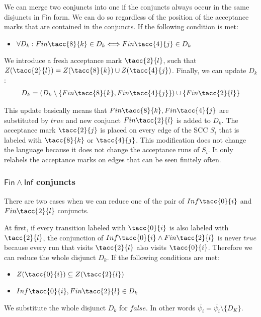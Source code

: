 \documentclass[a4paper,UKenglish,cleveref, autoref, anonymous, thm-restate]{lipics-v2021}
\def\Inf{\ensuremath{\mathsf{Inf}}}
\def\Fin{\ensuremath{\mathsf{Fin}}}
\def\false{\mathit{false}}
\def\true{\mathit{true}}
\begin{document}
We can merge two conjuncts into one if the conjuncts always occur in the same disjuncts in $\Fin$ form. We can do so regardless of the position of the acceptance marks that are contained in the conjuncts. 
If the following condition is met:
\begin{itemize}
    \item $\forall D_{k}: \Fin\tacc{8}{k} \in D_{k} \Longleftrightarrow \Fin\tacc{4}{j} \in D_{k}$
\end{itemize}
We introduce a fresh acceptance mark $\tacc{2}{l}$, such that $Z(\tacc{2}{l}) = Z(\tacc{8}{k}) \cup Z(\tacc{4}{j})$.
 Finally, we can update $D_{k}$:
\begin{align*}
    D_{k} = (D_{k} \setminus \{ \Fin\tacc{8}{k}, \Fin\tacc{4}{j} \}) \cup \{\Fin\tacc{2}{l}\}
\end{align*}

This update basically means that $\Fin\tacc{8}{k}, \Fin\tacc{4}{j}$ are substituted by $\true$ and new conjunct $\Fin\tacc{2}{l}$ is added to $D_{k}$. The acceptance mark $\tacc{2}{j}$ is placed on every edge of the SCC $S_{i}$ that is labeled with $\tacc{8}{k}$ or $\tacc{4}{j}$.
This modification does not change the language because it does not change the acceptance runs of $S_{i}$. It only relabels the acceptance marks on edges that can be seen finitely often. 



\subsubsection{$\Fin \land \Inf$ conjuncts\\}
There are two cases when we can reduce one of the pair of $\Inf\tacc{0}{i}$ and $\Fin\tacc{2}{l}$ conjuncts.

At first, if every transition labeled with  $\tacc{0}{i}$ is also labeled with $\tacc{2}{l}$, the conjunction of $\Inf\tacc{0}{i} \land \Fin\tacc{2}{l}$ is never $\true$ because every run that visits $\tacc{2}{l}$ also visits $\tacc{0}{i}$. Therefore we can reduce the whole disjunct $D_{k}$.
If the following conditions are met:
\begin{itemize}
    \item $Z(\tacc{0}{i}) \subseteq Z(\tacc{2}{l})$
    \item $\Inf\tacc{0}{i}, \Fin\tacc{2}{l} \in D_{k}$
\end{itemize}
We substitute the whole disjunct $D_{k}$ for $\false$. In other words $\overline{\psi_{i}} = \overline{\psi_{i}} \setminus \{D_{K}\}$.
\end{document}
